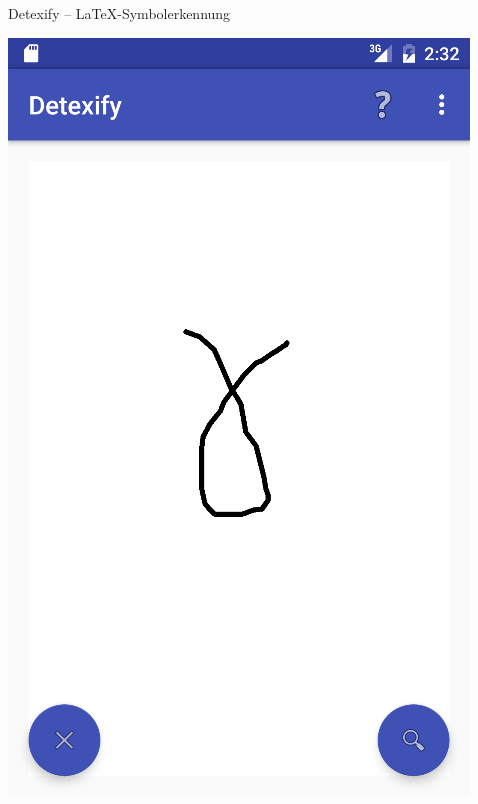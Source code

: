 \documentclass{beamer}
\begin{document}
\begin{frame}{Detexify -- \LaTeX-Symbolerkennung}
\begin{minipage}{0.45\textwidth}
\begin{center}
			\includegraphics[height=0.48\textheight]{images/detexify-app1}

\end{center}
\end{minipage}
\end{frame}
\end{document}
